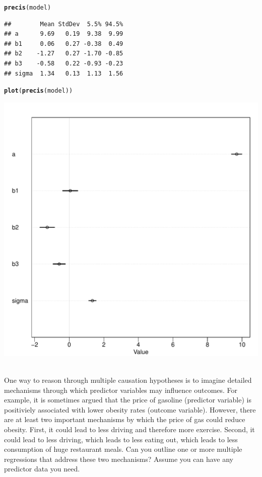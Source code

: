 \documentclass[12pt]{article}\usepackage[]{graphicx}\usepackage[]{color}
\makeatletter
\def\maxwidth{ %
  \ifdim\Gin@nat@width>\linewidth
    \linewidth
  \else
    \Gin@nat@width
  \fi
}
\newcommand{\hlstd}[1]{\textcolor[rgb]{0.345,0.345,0.345}{#1}}%
\newcommand{\hlkwd}[1]{\textcolor[rgb]{0.737,0.353,0.396}{\textbf{#1}}}%
\newenvironment{kframe}{%
 \def\at@end@of@kframe{}%
 \ifinner\ifhmode%
  \def\at@end@of@kframe{\end{minipage}}%
  \begin{minipage}{\columnwidth}%
 \fi\fi%
 \def\FrameCommand##1{\hskip\@totalleftmargin \hskip-\fboxsep
 \colorbox{shadecolor}{##1}\hskip-\fboxsep
     \hskip-\linewidth \hskip-\@totalleftmargin \hskip\columnwidth}%
 \MakeFramed {\advance\hsize-\width
   \@totalleftmargin\z@ \linewidth\hsize
   \@setminipage}}%
 {\par\unskip\endMakeFramed%
 \at@end@of@kframe}
\newenvironment{knitrout}{}{} %
\newenvironment{problem}[2][Problem]{\begin{trivlist}
\item[\hskip \labelsep {\bfseries #1}\hskip \labelsep {\bfseries #2.}]}{\end{trivlist}}
\makeatother
\begin{document}
\begin{knitrout}
\begin{kframe}
\begin{alltt}
\hlkwd{precis}\hlstd{(model)}
\end{alltt}
\begin{verbatim}
##        Mean StdDev  5.5% 94.5%
## a      9.69   0.19  9.38  9.99
## b1     0.06   0.27 -0.38  0.49
## b2    -1.27   0.27 -1.70 -0.85
## b3    -0.58   0.22 -0.93 -0.23
## sigma  1.34   0.13  1.13  1.56
\end{verbatim}
\begin{alltt}
\hlkwd{plot}\hlstd{(}\hlkwd{precis}\hlstd{(model))}
\end{alltt}
\end{kframe}
\includegraphics[width=\maxwidth]{figure/unnamed-chunk-4-1} 

\end{knitrout}

\begin{problem}{5M5}
\text{ }\\
One way to reason through multiple causation hypotheses is to imagine detailed mechanisms through which predictor variables may influence outcomes. For example, it is sometimes argued that the price of gasoline (predictor variable) is positiviely associated with lower obesity rates (outcome variable). However, there are at least two important mechanisms by which the price of gas could reduce obesity. First, it could lead to less driving and therefore more exercise. Second, it could lead to less driving, which leads to less eating out, which leads to less consumption of huge restaurant meals. Can you outline one or more multiple regressions that address these two mechanisms? Assume you can have any predictor data you need.
\end{problem}
\end{document}
